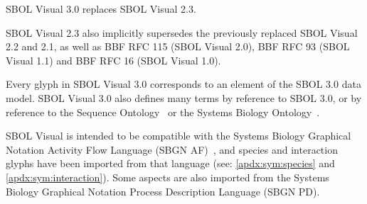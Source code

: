 
SBOL Visual 3.0 replaces SBOL Visual 2.3.
%

SBOL Visual 2.3 also implicitly supersedes the previously replaced SBOL Visual 2.2 and 2.1, as well as BBF RFC 115 (SBOL Visual 2.0), BBF RFC 93 (SBOL Visual 1.1) and BBF RFC 16 (SBOL Visual 1.0).

Every glyph in SBOL Visual 3.0 corresponds to an element of the SBOL 3.0 data model.
SBOL Visual 3.0 also defines many terms by reference to SBOL 3.0, 
or by reference to the Sequence Ontology~\citep{SequenceOntology}
or the Systems Biology Ontology~\citep{SBO}.

SBOL Visual is intended to be compatible with the Systems Biology Graphical Notation Activity Flow Language (SBGN AF)~\citep{sbgn}, 
and species and interaction glyphs have been imported from that language (see: \ref{apdx:sym:species} and \ref{apdx:sym:interaction}).
Some aspects are also imported from the Systems Biology Graphical Notation Process Description Language (SBGN PD).
